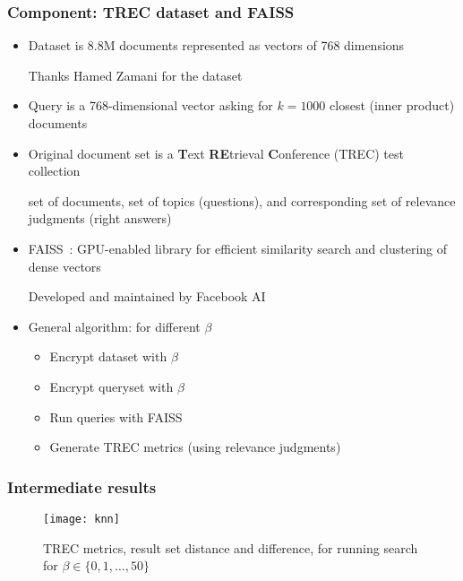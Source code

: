	\begin{frame}[label={frame:appendix:trec-faiss}]

		\frametitle{Component: TREC dataset and FAISS~\cite{faiss}}

		\begin{itemize}
			\item<1->
				Dataset is 8.8M documents represented as vectors of 768 dimensions \\
				\begin{small}
					Thanks Hamed Zamani for the dataset
				\end{small}

			\item<2->
				Query is a 768-dimensional vector asking for $k = 1000$ closest (inner product) documents

			\item<3->
				Original document set is a \textbf{T}ext \textbf{RE}trieval \textbf{C}onference (TREC) test collection \\
				\begin{small}
					set of documents, set of topics (questions), and corresponding set of relevance judgments (right answers)
				\end{small}

			\item<4->
				FAISS~\cite{faiss}: GPU-enabled library for efficient similarity search and clustering of dense vectors
				\begin{small}
					Developed and maintained by Facebook AI
				\end{small}

			\item<5->
				General algorithm: for different $\beta$
				\begin{itemize}
					\item Encrypt dataset with $\beta$
					\item Encrypt queryset with $\beta$
					\item Run queries with FAISS
					\item Generate TREC metrics (using relevance judgments)
				\end{itemize}

		\end{itemize}

		\hyperlink{frame:knn}{}

	\end{frame}

	\begin{frame}[label={frame:appendix:knn-plot}]

		\frametitle{Intermediate results}

		\begin{figure}[h]
			\centering
			\texttt{[image: knn]}
			\caption{
				TREC metrics, result set distance and difference, for running \knn{} search for $\beta \in \{ 0, 1, \ldots , 50 \} $ \\
				\hyperlink{frame:knn}{}
			}
		\end{figure}

	\end{frame}

